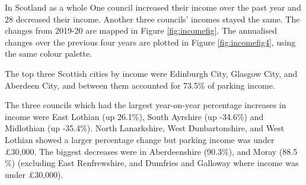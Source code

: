 \documentclass[
  12pt,
]{article}
\begin{document}
In Scotland as a whole One council increased their income over the past year and 28 decreased their income. Another three councils' incomes stayed the same.
The changes from 2019-20 are mapped in Figure \ref{fig:incomefig}. The annualised changes over the previous four years are plotted in Figure \ref{fig:incomefig4}, using the same colour palette.

The top three Scottish cities by income were Edinburgh City, Glasgow City, and Aberdeen City, and between them accounted for 73.5\% of parking income.

The three councils which had the largest year-on-year percentage increases in income were East Lothian (up 26.1\%), South Ayrshire (up -34.6\%) and Midlothian (up -35.4\%).
North Lanarkshire, West Dunbartonshire, and West Lothian showed a larger percentage change but parking income was under £30,000. The biggest decreases were in Aberdeenshire (90.3\%), and Moray (88.5 \%) (excluding East Renfrewshire, and Dumfries and Galloway where income was under £30,000).

\begingroup\fontsize{9}{11}\selectfont
\end{document}
